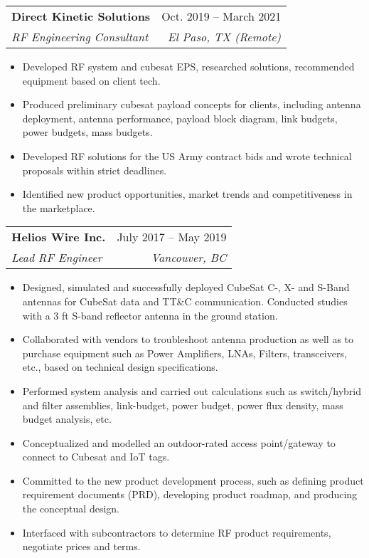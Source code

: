 \documentclass[letterpaper,11pt]{article}
\makeatletter
\newcommand{\resumeItem}[1]{
  \item\small{
    {#1 \vspace{-2pt}}
  }
}
\newcommand{\resumeSubheading}[4]{
  \vspace{-2pt}\item
    \begin{tabular*}{0.97\textwidth}[t]{l@{\extracolsep{\fill}}r}
      \textbf{#1} & #2 \\
      \textit{\small#3} & \textit{\small #4} \\
    \end{tabular*}\vspace{-7pt}
}
\newcommand{\resumeSubSubheading}[2]{
    \item
    \begin{tabular*}{0.97\textwidth}{l@{\extracolsep{\fill}}r}
      \textit{\small#1} & \textit{\small #2} \\
    \end{tabular*}\vspace{-7pt}
}
\newcommand{\resumeSubHeadingListEnd}{\end{itemize}}
\newcommand{\resumeItemListStart}{\begin{itemize}}
\newcommand{\resumeItemListEnd}{\end{itemize}\vspace{-5pt}}
\makeatother
\begin{document}

    \resumeSubheading
      {Direct Kinetic Solutions}{Oct. 2019 -- March 2021}
      {RF Engineering Consultant}{El Paso, TX (Remote)}
      \resumeItemListStart
        \resumeItem{Developed RF system and cubesat EPS, researched solutions, recommended equipment based on client tech.}
        \resumeItem{Produced preliminary cubesat payload concepts for clients, including antenna deployment, antenna performance, payload block diagram, link budgets, power budgets, mass budgets.}
        \resumeItem{Developed RF solutions for the US Army contract bids and wrote technical proposals within strict deadlines.}
        \resumeItem{Identified new product opportunities, market trends and competitiveness in the marketplace.}
    \resumeItemListEnd

    \resumeSubheading
      {Helios Wire Inc.}{July 2017 -- May 2019}
      {Lead RF Engineer}{Vancouver, BC}
      \resumeItemListStart
        \resumeItem{Designed, simulated and successfully deployed CubeSat C-, X- and S-Band antennas for CubeSat data and TT\&C communication. Conducted studies with a 3 ft S-band reflector antenna in the ground station.}
        \resumeItem{Collaborated with vendors to troubleshoot antenna production as well as to purchase equipment such as Power Amplifiers, LNAs, Filters, transceivers, etc., based on technical design specifications.}
        \resumeItem{Performed system analysis and carried out calculations such as switch/hybrid and filter assemblies, link-budget, power budget, power flux density, mass budget analysis, etc.}
        \resumeItem{Conceptualized and modelled an outdoor-rated access point/gateway to connect to Cubesat and IoT tags.}
        \resumeItem{Committed to the new product development process, such as defining product requirement documents (PRD), developing product roadmap, and producing the conceptual design.}
        \resumeItem{Interfaced with subcontractors to determine RF product requirements, negotiate prices and terms.}
      \resumeItemListEnd
\end{document}

